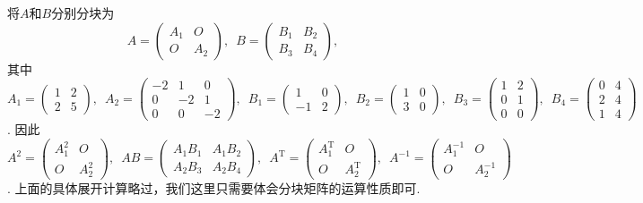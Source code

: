\begin{solution}
    将$A$和$B$分别分块为
    \[A=\begin{pmatrix}
            A_1 & O \\ O & A_2
        \end{pmatrix},\enspace B=\begin{pmatrix}
            B_1 & B_2 \\ B_3 & B_4
        \end{pmatrix},\]
    其中$A_1=\begin{pmatrix}
            1 & 2 \\ 2 & 5
        \end{pmatrix},\enspace A_2=\begin{pmatrix}
            -2 & 1 & 0 \\ 0 & -2 & 1 \\ 0 & 0 & -2
        \end{pmatrix},\enspace B_1=\begin{pmatrix}
            1 & 0 \\ -1 & 2
        \end{pmatrix},\enspace B_2=\begin{pmatrix}
            1 & 0 \\ 3 & 0
        \end{pmatrix},\enspace B_3=\begin{pmatrix}
            1 & 2 \\ 0 & 1 \\ 0 & 0
        \end{pmatrix},\enspace B_4=\begin{pmatrix}
            0 & 4 \\ 2 & 4 \\ 1 & 4
        \end{pmatrix}$. 因此$A^2=\begin{pmatrix}
            A_1^2 & O \\ O & A_2^2
        \end{pmatrix},\enspace AB=\begin{pmatrix}
            A_1B_1 & A_1B_2 \\ A_2B_3 & A_2B_4
        \end{pmatrix},\enspace A^\mathrm{T}=\begin{pmatrix}
            A_1^\mathrm{T} & O \\ O & A_2^\mathrm{T}
        \end{pmatrix},\enspace A^{-1}=\begin{pmatrix}
            A_1^{-1} & O \\ O & A_2^{-1}
        \end{pmatrix}$. 上面的具体展开计算略过，我们这里只需要体会分块矩阵的运算性质即可.
\end{solution}

